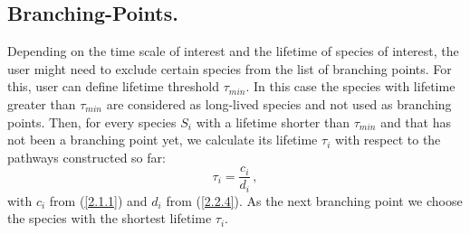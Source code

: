 \subsection{Branching-Points.}
\label{sec2c2}
Depending on the time scale of interest and the lifetime of species of interest, the user might need to exclude certain species from the list of branching points. For this, user can define lifetime threshold $\tau_{min}$.  In this case the species with lifetime greater than $\tau_{min}$ are considered as long-lived species and not used as branching points. Then, for every species $S_i$ with a lifetime shorter than $\tau_{min}$ and that has not been a branching point yet, we calculate its lifetime $\tau_i$ with respect to the pathways constructed so far:
\begin{equation}
\tau_i = \frac{c_i}{d_i}\,,
\label{2.4.1}
\end{equation}
with $c_i$ from (\ref{2.1.1}) and $d_i$ from (\ref{2.2.4}). As the next branching point we choose the species with the shortest lifetime $\tau_i$.


